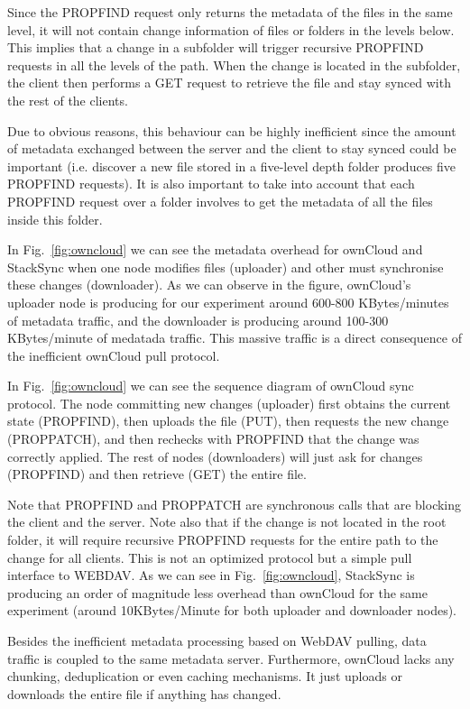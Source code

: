 Since the PROPFIND request only returns the metadata of the files in the same level, it will not contain change information of files or folders in the levels below. This implies that a change in a subfolder will trigger recursive PROPFIND requests in all the levels of the path. When the change is located in the subfolder, the client then performs a GET request to retrieve the file and stay synced with the rest of the clients.

Due to obvious reasons, this behaviour can be highly inefficient since the amount of metadata exchanged between the server and the client to stay synced could be important (i.e. discover a new file stored in a five-level depth folder produces five PROPFIND requests). It is also important to take into account that each PROPFIND request over a folder involves to get the metadata of all the files inside this folder.

In Fig.~\ref{fig:owncloud} we can see the metadata overhead for ownCloud and StackSync when one node modifies files (uploader) and other must synchronise these changes (downloader). As we can observe in the figure, ownCloud's uploader node is producing for our experiment around 600-800 KBytes/minutes of metadata traffic, and the downloader is producing around 100-300 KBytes/minute of medatada traffic.  This massive traffic is a direct consequence of the inefficient ownCloud pull protocol.

In Fig.~\ref{fig:owncloud} we can see the sequence diagram of ownCloud sync protocol. The node committing new changes (uploader) first obtains the current state (PROPFIND), then uploads the file (PUT), then requests the new change (PROPPATCH), and then rechecks with PROPFIND that the change was correctly applied. The rest of nodes (downloaders) will just ask for changes (PROPFIND) and then retrieve (GET) the entire file. 


Note that PROPFIND and PROPPATCH are synchronous calls that are blocking the client and the server. Note also that if the change is not located in the root folder, it will require recursive PROPFIND requests for the entire path to the change for all clients.  This is not an optimized protocol but a simple pull interface to WEBDAV. As we can see in Fig.~\ref{fig:owncloud},  StackSync is producing an order of magnitude less overhead  than ownCloud for the same experiment  (around 10KBytes/Minute for both uploader and downloader nodes). 


Besides the inefficient metadata processing based on WebDAV pulling, data traffic is coupled to the same metadata server. Furthermore, ownCloud lacks any chunking, deduplication or even caching mechanisms. It just uploads or downloads the entire file if anything has changed.

